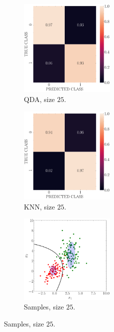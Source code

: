 \documentclass[12pt, a4 paper]{article}
\begin{document}
\begin{figure}[!htbp]
\quad \quad 
    \begin{subfigure}[!htbp]{0.24\textwidth}
       \centering
       \includegraphics[width=1.8in]{../results/ex1/conf_mtx_QD_ML_dataset_P1b_size_25.pdf}
       \caption{QDA, size $25$.}
       \label{fig:KNN_P1b_25}
    \end{subfigure}
\quad \quad
    \begin{subfigure}[!htbp]{0.24\textwidth}
       \centering
       \includegraphics[width=1.8in]{../results/ex1/conf_mtx_KNN_dataset_P1b_size_25.pdf}
       \caption{KNN, size $25$.}
       \label{fig:KNN_P1b_25}
    \end{subfigure}
\quad
    \begin{subfigure}[!htbp]{0.24\textwidth}
       \centering
       \includegraphics[width=1.8in]{../results/ex1/samples_QD_ML_dataset_P1b_size_25.pdf}
       \caption{Samples, size $25$.}
       \label{fig:KNN_P1b_25}
    \end{subfigure}
    

\end{figure}
\end{document}

